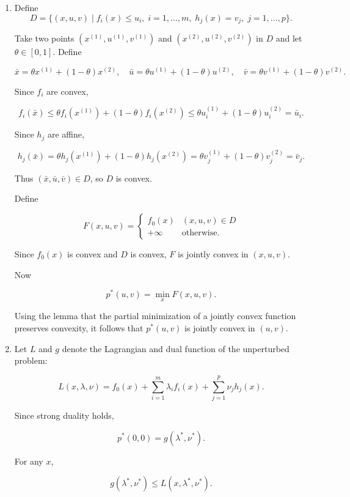 \documentclass[
	12pt,
]{fphw}
\begin{document}
\begin{enumerate}

\item[(a)]

Define
\[
D=\{(x,u,v)\mid f_i(x)\le u_i,\; i=1,\dots,m,\; h_j(x)=v_j,\; j=1,\dots,p\}.
\]

Take two points \((x^{(1)},u^{(1)},v^{(1)})\) and \((x^{(2)},u^{(2)},v^{(2)})\) in \(D\) and
let \(\theta\in[0,1]\). Define

\[
\bar x=\theta x^{(1)}+(1-\theta)x^{(2)},\quad
\bar u=\theta u^{(1)}+(1-\theta)u^{(2)},\quad
\bar v=\theta v^{(1)}+(1-\theta)v^{(2)}.
\]

Since \(f_i\) are convex,

\[
f_i(\bar x)
\le
\theta f_i(x^{(1)})+(1-\theta)f_i(x^{(2)})
\le
\theta u_i^{(1)}+(1-\theta)u_i^{(2)}
=\bar u_i .
\]

Since \(h_j\) are affine,

\[
h_j(\bar x)
=
\theta h_j(x^{(1)})+(1-\theta)h_j(x^{(2)})
=
\theta v_j^{(1)}+(1-\theta)v_j^{(2)}
=\bar v_j .
\]

Thus \((\bar x,\bar u,\bar v)\in D\), so \(D\) is convex.

Define

\[
F(x,u,v)=
\begin{cases}
f_0(x) & (x,u,v)\in D \\
+\infty & \text{otherwise}.
\end{cases}
\]

Since \(f_0(x)\) is convex and \(D\) is convex, \(F\) is jointly convex in
\((x,u,v)\).

Now

\[
p^*(u,v)=\min_x F(x,u,v).
\]

Using the lemma that the partial minimization of a jointly convex function
preserves convexity, it follows that \(p^*(u,v)\) is jointly convex in
\((u,v)\).

\item[(b)]

Let \(L\) and \(g\) denote the Lagrangian and dual function of the
unperturbed problem:

\[
L(x,\lambda,\nu)
=
f_0(x)+\sum_{i=1}^m \lambda_i f_i(x)+\sum_{j=1}^p \nu_j h_j(x).
\]

Since strong duality holds,

\[
p^*(0,0)=g(\lambda^*,\nu^*).
\]

For any \(x\),

\[
g(\lambda^*,\nu^*) \le L(x,\lambda^*,\nu^*).
\]


\end{enumerate}
\end{document}
